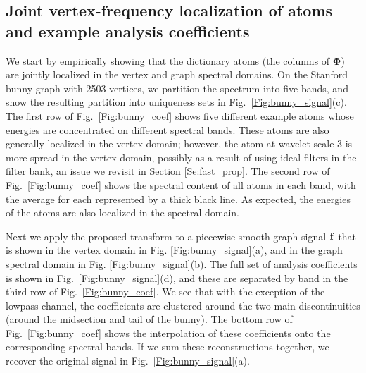 \documentclass[journal, 10pt]{IEEEtran}
\begin{document}
\subsection{Joint vertex-frequency localization of atoms and example analysis coefficients}
We start by empirically showing that the dictionary atoms (the columns of $\boldsymbol{\Phi}$) are jointly localized in the vertex and graph spectral domains. On the Stanford bunny graph \cite{bunny} with 2503 vertices, we partition the spectrum into five bands, and show the resulting partition into uniqueness sets 
in Fig.\ \ref{Fig:bunny_signal}(c). The first row of Fig.\ \ref{Fig:bunny_coef} shows five different example atoms whose energies are concentrated on different spectral bands. %
These atoms are also generally localized in the vertex domain; however,  %
the atom at wavelet scale 3 %
is more spread in the vertex domain, possibly as a result of using ideal filters in the filter bank, an issue we revisit in Section \ref{Se:fast_prop}. The second row of Fig.\ \ref{Fig:bunny_coef} shows the spectral content of all atoms in each band, with the average for each represented by a thick black line. As expected, the energies of the atoms are also localized in the spectral domain. %

Next we apply the proposed transform to a piecewise-smooth graph signal ${\bf f}$ that is shown in the vertex domain in Fig. \ref{Fig:bunny_signal}(a), and in the graph spectral domain in Fig. \ref{Fig:bunny_signal}(b). The full set of analysis coefficients is shown in Fig.\ \ref{Fig:bunny_signal}(d), and these are separated by band in the third row of Fig.\ \ref{Fig:bunny_coef}. We see that with the exception of the lowpass channel, the coefficients are clustered around the two main discontinuities (around the midsection and tail of the bunny). The bottom row of Fig.\ \ref{Fig:bunny_coef} shows the interpolation of these coefficients onto the corresponding spectral bands. If we sum these reconstructions together, we recover %
 the original signal in Fig.\ \ref{Fig:bunny_signal}(a).
\end{document}
